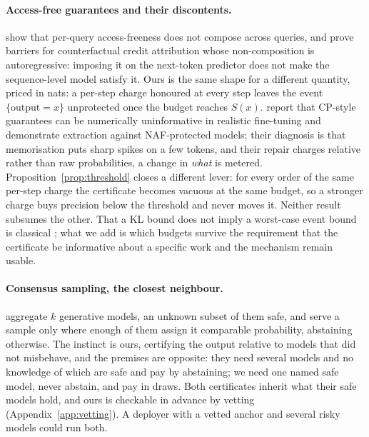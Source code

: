 \paragraph{Access-free guarantees and their discontents.}
\citet{cohen2025blameless} show that per-query access-freeness does not compose across queries, and
\citet{cohen2026barriers} prove barriers for counterfactual credit attribution whose non-composition is
autoregressive: imposing it on the next-token predictor does not make the sequence-level model satisfy it.
Ours is the same shape for a different quantity, priced in nats: a per-step charge honoured at every step
leaves the event $\{\text{output}=x\}$ unprotected once the budget reaches $S(x)$. \citet{segal2026provably}
report that CP-style guarantees can be numerically uninformative in realistic fine-tuning and demonstrate
extraction against NAF-protected models; their diagnosis is that memorisation puts sharp spikes on a few
tokens, and their repair charges relative rather than raw probabilities, a change in \emph{what} is
metered. Proposition~\ref{prop:threshold} closes a different lever: for every order of the same per-step
charge the certificate becomes vacuous at the same budget, so a stronger charge buys precision below the
threshold and never moves it. Neither result subsumes the other. That a KL bound does not imply a
worst-case event bound is classical \citep{sason2016fdivergence,vanerven2014renyi}; what we add is which
budgets survive the requirement that the certificate be informative about a specific work and the
mechanism remain usable.

\paragraph{Consensus sampling, the closest neighbour.}\label{app:kalai}
\citet{kalai2026consensus} aggregate $k$ generative models, an unknown subset of them safe, and serve a
sample only where enough of them assign it comparable probability, abstaining otherwise. The instinct is
ours, certifying the output relative to models that did not misbehave, and the premises are opposite: they
need several models and no knowledge of which are safe and pay by abstaining; we need one named safe model,
never abstain, and pay in draws. Both certificates inherit what their safe models hold, and ours is
checkable in advance by vetting (Appendix~\ref{app:vetting}). A deployer with a vetted anchor and several
risky models could run both.

